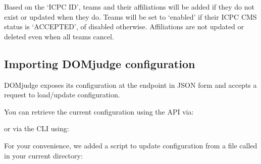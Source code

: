 \documentclass[a4paper,10pt,english,openany]{sphinxmanual}
\begin{document}
\sphinxAtStartPar
Based on the ‘ICPC ID’, teams and their affiliations will be added if they do not
exist or updated when they do. Teams will be set to ‘enabled’ if their ICPC CMS
status is ‘ACCEPTED’, of disabled otherwise. Affiliations are not updated or
deleted even when all teams cancel.


\subsection{Importing DOMjudge configuration}
\label{\detokenize{import:importing-domjudge-configuration}}
\sphinxAtStartPar
DOMjudge exposes its configuration at the  endpoint in JSON
form and accepts a  request to load/update configuration.

\sphinxAtStartPar
You can retrieve the current configuration using the API via:

\begin{sphinxVerbatim}[commandchars=\\\{\}]
     
\end{sphinxVerbatim}

\sphinxAtStartPar
or via the CLI using:

\begin{sphinxVerbatim}[commandchars=\\\{\}]
    
\end{sphinxVerbatim}

\sphinxAtStartPar
For your convenience, we added a script to update configuration from a file
called  in your current directory:

\begin{sphinxVerbatim}[commandchars=\\\{\}]
 
\end{sphinxVerbatim}
\end{document}
